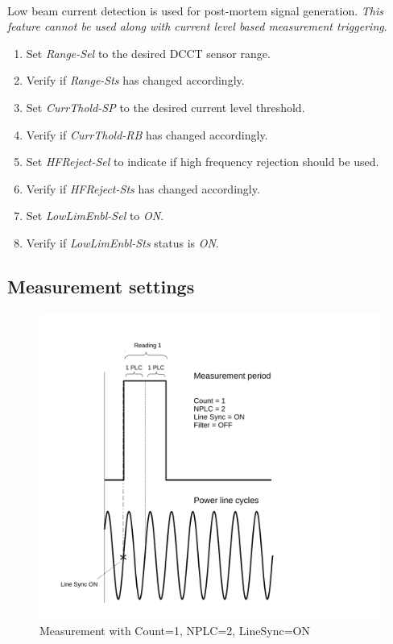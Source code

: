\documentclass[openany]{article}
\begin{document}
		\paragraph{} Low beam current detection is used for post-mortem signal generation. \emph{This feature cannot be used along with current level based measurement triggering}.

			\begin{enumerate}
				\item Set \emph{Range-Sel} to the desired DCCT sensor range.
				\item Verify if \emph{Range-Sts} has changed accordingly.
				\item Set \emph{CurrThold-SP} to the desired current level threshold.
				\item Verify if \emph{CurrThold-RB} has changed accordingly.
				\item Set \emph{HFReject-Sel} to indicate if high frequency rejection should be used.
				\item Verify if \emph{HFReject-Sts} has changed accordingly.
				\item Set \emph{LowLimEnbl-Sel} to \emph{ON}.
				\item Verify if \emph{LowLimEnbl-Sts} status is \emph{ON}.
			\end{enumerate}

	\subsection{Measurement settings}\label{measurement-settings}

		\begin{figure}[!h]
			\caption{Measurement with Count=1, NPLC=2, LineSync=ON}
			\label{fig:meas-param1}
			\centering
			\includegraphics[width=1.0\textwidth]{dcct-meas-param1-image}
		\end{figure}
\end{document}
